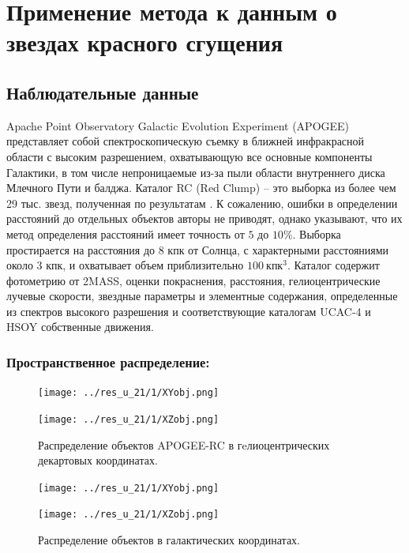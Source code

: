 \documentclass{matmex-diploma-custom}
\begin{document}
\section{Применение метода к данным о звездах красного сгущения}
\subsection{Наблюдательные данные}
Apache Point Observatory Galactic Evolution Experiment (APOGEE) представляет собой спектроскопическую съемку в ближней инфракрасной области с высоким разрешением, охватывающую все основные компоненты Галактики, в том числе непроницаемые из-за пыли области внутреннего диска Млечного Пути и балджа. Каталог RC (Red Clump) \cite{1} \cite{2} -- это выборка из более чем 29 тыс. звезд, полученная по результатам \cite{5}. К сожалению, ошибки в определении расстояний до отдельных объектов авторы не приводят, однако указывают, что их метод определения расстояний имеет точность от $5$ до $10\%$. Выборка простирается на расстояния до 8 кпк от Солнца, с характерными расстояниями около 3 кпк, и охватывает объем приблизительно $100 ~\textrm{кпк}^3$.  Каталог содержит фотометрию от 2MASS, оценки покраснения, расстояния, гелиоцентрические лучевые скорости, звездные параметры и элементные содержания, определенные из спектров высокого разрешения и соответствующие каталогам UCAC-4 и HSOY собственные движения. 

\subsubsection*{Пространственное распределение:}

\begin{figure}[h!]
\caption{Распределение объектов APOGEE-RC в гeлиоцентрических декартовых координатах.}
\begin{minipage}[h]{0.49\linewidth}
        \texttt{[image: ../res\_u\_21/1/XYobj.png]}
\end{minipage}
\hfill
\begin{minipage}[h]{0.49\linewidth}
        \texttt{[image: ../res\_u\_21/1/XZobj.png]}
\end{minipage}
\end{figure}


\pagebreak

\begin{figure}[h!]
\caption{Распределение объектов в галактических координатах.}
\begin{minipage}[h]{0.49\linewidth}
        \texttt{[image: ../res\_u\_21/1/XYobj.png]}
\end{minipage}
\hfill
\begin{minipage}[h]{0.49\linewidth}
        \texttt{[image: ../res\_u\_21/1/XZobj.png]}
\end{minipage}
\end{figure}
\end{document}
